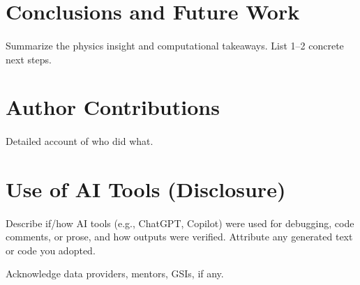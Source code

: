 \documentclass[reprint, superscriptaddress, aps]{revtex4-2}
\begin{document}
\section{Conclusions and Future Work}

\paragraph*{} Summarize the physics insight and computational takeaways. List 1–2 concrete next steps.

\section*{Author Contributions}

\paragraph*{} Detailed account of who did what. 

\section*{Use of AI Tools (Disclosure)}

\paragraph*{} Describe if/how AI tools (e.g., ChatGPT, Copilot) were used for debugging, code comments, or prose, and how outputs were verified. Attribute any generated text or code you adopted.

\begin{acknowledgments}
Acknowledge data providers, mentors, GSIs, if any.
\end{acknowledgments}


\begingroup
{
}
\endgroup
\end{document}
